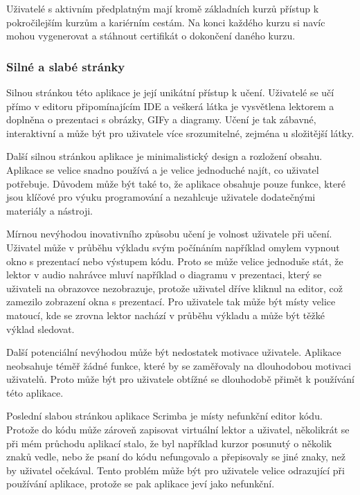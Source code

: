 Uživatelé s aktivním předplatným mají kromě základních kurzů přístup k pokročilejším kurzům a kariérním cestám. Na konci každého kurzu si navíc mohou vygenerovat a stáhnout certifikát o dokončení daného kurzu.

\subsubsection{Silné a slabé stránky}

Silnou stránkou této aplikace je její unikátní přístup k učení. Uživatelé se učí přímo v editoru připomínajícím IDE a veškerá látka je vysvětlena lektorem a doplněna o prezentaci s obrázky, GIFy a diagramy. Učení je tak zábavné, interaktivní a může být pro uživatele více srozumitelné, zejména u složitější látky.

Další silnou stránkou aplikace je minimalistický design a rozložení obsahu. Aplikace se velice snadno používá a je velice jednoduché najít, co uživatel potřebuje. Důvodem může být také to, že aplikace obsahuje pouze funkce, které jsou klíčové pro výuku programování a nezahlcuje uživatele dodatečnými materiály a nástroji.

Mírnou nevýhodou inovativního způsobu učení je volnost uživatele při učení. Uživatel může v průběhu výkladu svým počínáním například omylem vypnout okno s prezentací nebo výstupem kódu. Proto se může velice jednoduše stát, že lektor v audio nahrávce mluví například o diagramu v prezentaci, který se uživateli na obrazovce nezobrazuje, protože uživatel dříve kliknul na editor, což zamezilo zobrazení okna s prezentací. Pro uživatele tak může být místy velice matoucí, kde se zrovna lektor nachází v průběhu výkladu a může být těžké výklad sledovat.

Další potenciální nevýhodou může být nedostatek motivace uživatele. Aplikace neobsahuje téměř žádné funkce, které by se zaměřovaly na dlouhodobou motivaci uživatelů. Proto může být pro uživatele obtížné se dlouhodobě přimět k používání této aplikace.

Poslední slabou stránkou aplikace Scrimba je místy nefunkční editor kódu. Protože do kódu může zároveň zapisovat virtuální lektor a uživatel, několikrát se při mém průchodu aplikací stalo, že byl například kurzor posunutý o několik znaků vedle, nebo že psaní do kódu nefungovalo a přepisovaly se jiné znaky, než by uživatel očekával. Tento problém může být pro uživatele velice odrazující při používání aplikace, protože se pak aplikace jeví jako nefunkční.

